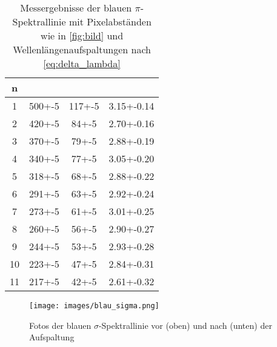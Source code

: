 \begin{table}[h]
    \centering
    \caption{Messergebnisse der blauen $\pi$-Spektrallinie mit Pixelabständen wie in \autoref{fig:bild} und Wellenlängenaufspaltungen nach \autoref{eq:delta_lambda}}
    \label{tab:blau_pi}
    \begin{tabular}{S[table-format=1.0] S[table-format=3.0(1)] S[table-format=3.0(1)] S[table-format=1.2(3)]}
        \toprule
        n &  & & \tableSI{\delta \lambda}{\pico\meter}  \\
         & 500+-5 & 117+-5 & 3.15+-0.14 \\
        2 & 420+-5 & 84+-5 & 2.70+-0.16 \\
        3 & 370+-5 & 79+-5 & 2.88+-0.19 \\
        4 & 340+-5 & 77+-5 & 3.05+-0.20 \\
        5 & 318+-5 & 68+-5 & 2.88+-0.22 \\
        6 & 291+-5 & 63+-5 & 2.92+-0.24 \\
        7 & 273+-5 & 61+-5 & 3.01+-0.25 \\
        8 & 260+-5 & 56+-5 & 2.90+-0.27 \\
        9 & 244+-5 & 53+-5 & 2.93+-0.28 \\
        10 & 223+-5 & 47+-5 & 2.84+-0.31 \\
        11 & 217+-5 & 42+-5 & 2.61+-0.32 \\
        \bottomrule
    \end{tabular}
\end{table}

\begin{figure}[h]
    \centering
    \texttt{[image: images/blau\_sigma.png]}
    \caption{Fotos der blauen $\sigma$-Spektrallinie vor (oben) und nach (unten) der Aufspaltung}
    \label{fig:blau_sigma}
\end{figure}

